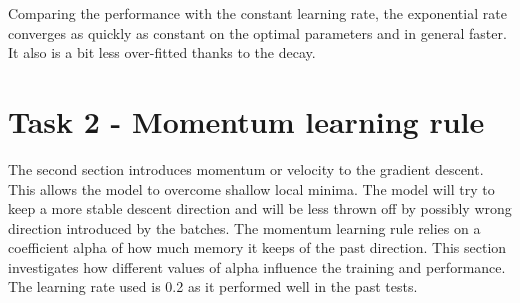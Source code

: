 \documentclass[12pt]{article}
\begin{document}
Comparing the performance with the constant learning rate, the exponential rate converges as quickly as constant on the optimal parameters and in general faster. It also is a bit less over-fitted thanks to the decay.

\section*{Task 2 - Momentum learning rule }
The second section introduces momentum or velocity to the gradient descent. This allows the model to overcome shallow local minima. The model will try to keep a more stable descent direction and will be less thrown off by possibly wrong direction introduced by the batches. The momentum learning rule relies on a coefficient alpha of how much memory it keeps of the past direction. This section investigates how different values of alpha influence the training and performance. The learning rate used is 0.2 as it performed well in the past tests.
\end{document}
